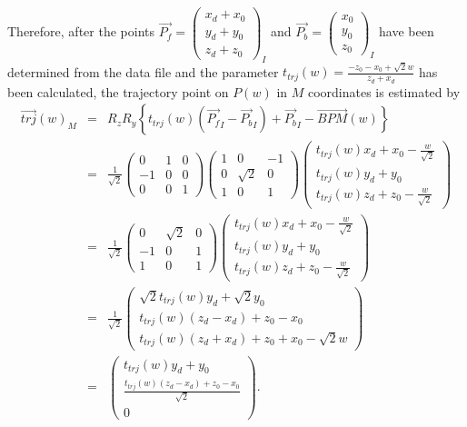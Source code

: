 \documentclass{article}
\begin{document}
Therefore, after the points $\vec{P_f} = \left(
\begin{array}{c}
	x_d + x_0 \\
	y_d + y_0 \\
	z_d + z_0
\end{array} \right)_I$ and $\vec{P_b} = \left(
\begin{array}{c}
	x_0 \\
	y_0 \\
	z_0
\end{array} \right)_I$ have been determined from the data file and the parameter $t_{trj}(w) = \frac{-z_0-x_0+\sqrt{2}w}{z_d+x_d}$ has been calculated, the trajectory point on $P(w)$ in $M$ coordinates is estimated by
\begin{eqnarray*}
\vec{trj}(w)_M & = & R_z R_y \left\{ t_{trj}(w) \left( \vec{P_f}_I - \vec{P_b}_I \right) + \vec{P_b}_I - \vec{BPM}(w) \right\} \\
& = & \frac{1}{\sqrt{2}} \left(
\begin{array}{ccc}
	0 & 1 & 0 \\
	-1 & 0 & 0 \\
	0 & 0 & 1
\end{array} \right) \left(
\begin{array}{ccc}
	1 & 0 & -1 \\
	0 & \sqrt{2} & 0 \\
	1 & 0 & 1
\end{array} \right) \left(
\begin{array}{c}
	t_{trj}(w) x_d + x_0 - \frac{w}{\sqrt{2}}\\
	t_{trj}(w) y_d + y_0 \\
	t_{trj}(w) z_d + z_0 - \frac{w}{\sqrt{2}}
\end{array} \right) \\
& = & \frac{1}{\sqrt{2}} \left(
\begin{array}{ccc}
	0 & \sqrt{2} & 0 \\
	-1 & 0 & 1 \\
	1 & 0 & 1
\end{array} \right) \left(
\begin{array}{c}
	t_{trj}(w) x_d + x_0 - \frac{w}{\sqrt{2}} \\
	t_{trj}(w) y_d + y_0 \\
	t_{trj}(w) z_d + z_0 - \frac{w}{\sqrt{2}}
\end{array} \right) \\
& = & \frac{1}{\sqrt{2}} \left(
\begin{array}{c}
	\sqrt{2}t_{trj}(w) y_d + \sqrt{2} y_0 \\
	t_{trj}(w) \left( z_d - x_d \right) + z_0 - x_0 \\
	t_{trj}(w) \left( z_d + x_d \right) + z_0 + x_0 - \sqrt{2}w
\end{array} \right) \\
& = & \left(
\begin{array}{c}
	t_{trj}(w) y_d + y_0 \\
	\frac{t_{trj}(w) \left( z_d-x_d \right) + z_0-x_0}{\sqrt{2}} \\
	0
\end{array} \right). \\
\end{eqnarray*}
\end{document}
